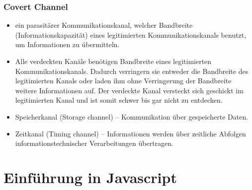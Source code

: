 \documentclass{article} %
\begin{document}
	\subsubsection{Covert Channel}
	\begin{itemize}
		\item ein parasitärer Kommunikationskanal, welcher Bandbreite (Informationskapazität) eines legitimierten Kommunikationskanals benutzt, um Informationen zu übermitteln.
		\item Alle verdeckten Kanäle benötigen Bandbreite eines legitimierten Kommunikationskanals. Dadurch verringern sie entweder die Bandbreite des legitimierten Kanals oder laden ihm ohne Verringerung der Bandbreite weitere Informationen auf. Der verdeckte Kanal versteckt sich geschickt im legitimierten Kanal und ist somit schwer bis gar nicht zu entdecken.
		\item Speicherkanal (Storage channel) – Kommunikation über gespeicherte Daten.
		\item Zeitkanal (Timing channel) – Informationen werden über zeitliche Abfolgen informationstechnischer Verarbeitungen übertragen.
	\end{itemize}
	\section{Einführung in Javascript}
\end{document}
